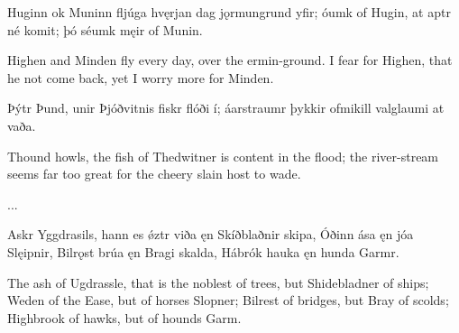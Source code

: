 \bvg
\bva Huginn ok Muninn \hld fljúga hvęrjan dag
\ind jǫrmungrund yfir;
óumk of Hugin, \hld at aptr né komit;
\ind þó séumk męir of Munin.\eva

\bvb Highen and Minden fly every day, over the ermin-ground. I fear for Highen, that he not come back, yet I worry more for Minden.\evb
\evg


\bvg
\bva Þýtr Þund, \hld unir Þjóðvitnis
\ind fiskr flóði í;
áarstraumr \hld þykkir ofmikill
\ind valglaumi at vaða.\eva

\bvb Thound howls, the fish of Thedwitner is content in the flood; the river-stream seems far too great for the cheery slain host to wade.\evb
\evg

...


\bvg
\bva Askr Yggdrasils, \hld hann es ǿztr viða
\ind ęn Skíðblaðnir skipa,
Óðinn ása \hld ęn jóa Slęipnir,
Bilrǫst brúa \hld ęn Bragi skalda,
Hábrók hauka \hld ęn hunda Garmr.\eva

\bvb The ash of Ugdrassle, that is the noblest of trees, but Shidebladner of ships; Weden of the Ease, but of horses Slopner; Bilrest of bridges, but Bray of scolds; Highbrook of hawks, but of hounds Garm.\evb
\evg

